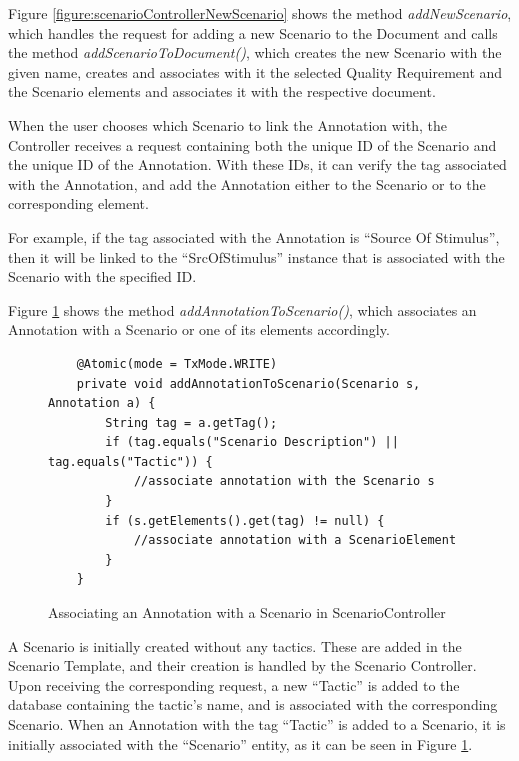 Figure \ref{figure:scenarioControllerNewScenario} shows the method \textit{addNewScenario}, which handles the request for adding a new Scenario to the Document and calls the method \textit{addScenarioToDocument()}, which creates the new Scenario with the given name, creates and associates with it the selected Quality Requirement and the Scenario elements and associates it with the respective document.

When the user chooses which Scenario to link the Annotation with, the Controller receives a request containing both the unique ID of the Scenario and the unique ID of the Annotation. With these IDs, it can verify the tag associated with the Annotation, and add the Annotation either to the Scenario or to the corresponding element. 

For example, if the tag associated with the Annotation is ``Source Of Stimulus'', then it will be linked to the ``SrcOfStimulus'' instance that is associated with the Scenario with the specified ID.

Figure \ref{figure:scenarioControllerLinkAnnotation} shows the method \textit{addAnnotationToScenario()}, which associates an Annotation with a Scenario or one of its elements accordingly.

\begin{figure}[h]
\lstset{style=customjava}
\begin{lstlisting}
	@Atomic(mode = TxMode.WRITE)
	private void addAnnotationToScenario(Scenario s, Annotation a) {
		String tag = a.getTag();
		if (tag.equals("Scenario Description") || tag.equals("Tactic")) {
			//associate annotation with the Scenario s
		}
		if (s.getElements().get(tag) != null) {
			//associate annotation with a ScenarioElement
		}
	}	
\end{lstlisting}
\caption{Associating an Annotation with a Scenario in ScenarioController}
\label{figure:scenarioControllerLinkAnnotation}
\end{figure}

A Scenario is initially created without any tactics. These are added in the Scenario Template, and their creation is handled by the Scenario Controller. Upon receiving the corresponding request, a new ``Tactic'' is added to the database containing the tactic's name, and is associated with the corresponding Scenario. When an Annotation with the tag ``Tactic'' is added to a Scenario, it is initially associated with the ``Scenario'' entity, as it can be seen in Figure \ref{figure:scenarioControllerLinkAnnotation}. 


